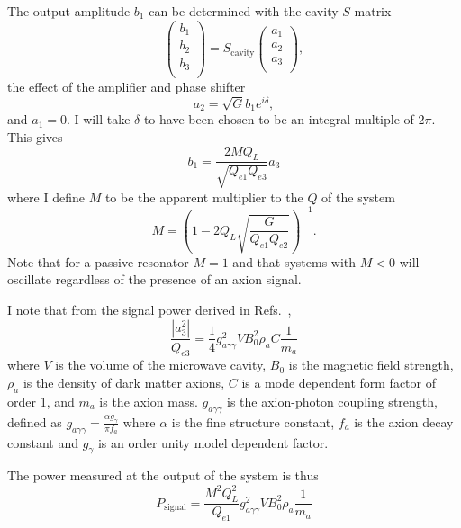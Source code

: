 \documentclass[aps,prl,twocolumn,groupedaddress]{revtex4-1}
\begin{document}
The output amplitude $b_1$ can be determined with the cavity $S$ matrix
\begin{equation}
\left(\begin{array}{c}
b_1\\
b_2\\
b_3\\
\end{array}\right)
=
S_{\mathrm{cavity}}\left(\begin{array}{c}
a_1\\
a_2\\
a_3\\
\end{array}\right),
\end{equation}
the effect of the amplifier and phase shifter
\begin{equation}
a_2=\sqrt{G}b_1e^{i\delta},
\end{equation}
and $a_1=0$.   I will take $\delta$ to have been chosen to be an integral multiple of $2\pi$.  This gives
\begin{equation}
b_1=\frac{2MQ_L}{\sqrt{Q_{e1}Q_{e3}}} a_3
\end{equation}
where I define $M$ to be the apparent multiplier to the $Q$ of the system
\begin{equation}
M=\left(1-2Q_L\sqrt{\frac{G}{Q_{e1}Q_{e2}}}\right)^{-1}.
\end{equation}
Note that for a passive resonator $M=1$ and that systems with $M<0$ will oscillate regardless of the presence of an axion signal. 

I note that from the signal power derived in Refs.~\cite{Cavity_idea_2,PhysRevLett.80.2043},
\begin{equation}
\frac{|a_3^2|}{Q_{e3}}=\frac{1}{4}g_{a\gamma\gamma}^2VB_0^2\rho_aC\frac{1}{m_a}
\end{equation}
where $V$ is the volume of the microwave cavity, $B_0$ is the magnetic field strength, $\rho_a$ is the density of dark matter axions, $C$ is a mode dependent form factor of order 1, and $m_a$ is the axion mass.  
$g_{a\gamma\gamma}$ is the axion-photon coupling strength, defined as $g_{a\gamma\gamma}=\frac{\alpha g_\gamma}{\pi f_a}$ where $\alpha$ is the fine structure constant, $f_a$ is the axion decay constant and $g_\gamma$ is an order unity model dependent factor.

 The power measured at the output of the system is thus
\begin{equation}
\label{eqn:rawsig}
P_{\mathrm{signal}}=\frac{M^2Q_L^2}{Q_{e1}}g_{a\gamma\gamma}^2VB_0^2\rho_a\frac{1}{m_a}
\end{equation}
\end{document}
